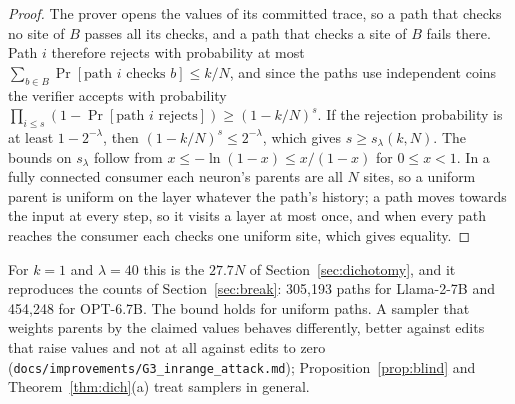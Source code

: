 \begin{proof}
The prover opens the values of its committed trace, so a path that checks no site of $B$ passes all
its checks, and a path that checks a site of $B$ fails there. Path $i$ therefore rejects with
probability at most $\sum_{b\in B}\Pr[\text{path $i$ checks $b$}]\le k/N$, and since the paths use
independent coins the verifier accepts with probability
$\prod_{i\le s}(1-\Pr[\text{path $i$ rejects}])\ge(1-k/N)^s$. If the rejection probability is at least
$1-2^{-\lambda}$, then $(1-k/N)^s\le2^{-\lambda}$, which gives $s\ge s_\lambda(k,N)$. The bounds on
$s_\lambda$ follow from $x\le-\ln(1-x)\le x/(1-x)$ for $0\le x<1$. In a fully connected consumer each
neuron's parents are all $N$ sites, so a uniform parent is uniform on the layer whatever the path's
history; a path moves towards the input at every step, so it visits a layer at most once, and when
every path reaches the consumer each checks one uniform site, which gives equality.
\end{proof}

\noindent For $k=1$ and $\lambda=40$ this is the $27.7N$ of Section~\ref{sec:dichotomy}, and it
reproduces the counts of Section~\ref{sec:break}: 305{,}193 paths for Llama-2-7B and 454{,}248 for
OPT-6.7B. The bound holds for uniform paths. A sampler that weights parents by the claimed values
behaves differently, better against edits that raise values and not at all against edits to zero
(\texttt{docs/improvements/G3\_inrange\_attack.md}); Proposition~\ref{prop:blind} and
Theorem~\ref{thm:dich}(a) treat samplers in general.

